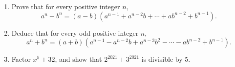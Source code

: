 \begin{enumerate}
\item[(a)] Prove that for every positive integer $n$,
\[a^n-b^n=(a-b)\left(a^{n-1}+a^{n-2}b+\cdots+ab^{n-2}+b^{n-1}\right).\]
\item[(b)] Deduce that for every odd positive integer $n$,
\[a^n+b^n=(a+b)\left(a^{n-1}-a^{n-2}b+a^{n-3}b^2-\cdots-ab^{n-2}+b^{n-1}\right).\]
\item[(c)] Factor $x^5+32$, and show that $2^{2021}+3^{2021}$ is divisible by $5$.
\end{enumerate}
